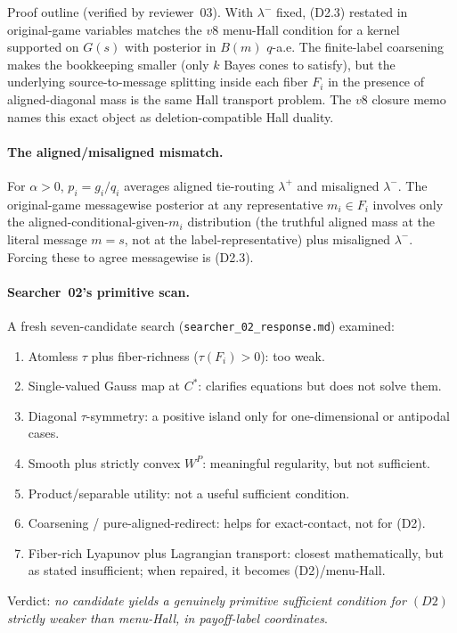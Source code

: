 \documentclass[11pt]{article}
\theoremstyle{definition}
\theoremstyle{remark}
\begin{document}
\noindent Proof outline (verified by reviewer~03). With $\lambda^-$
fixed, (D2.3) restated in original-game variables matches the $v8$
menu-Hall condition for a kernel supported on $G(s)$ with posterior in
$B(m)$ $q$-a.e. The finite-label coarsening makes the bookkeeping
smaller (only $k$ Bayes cones to satisfy), but the underlying
source-to-message splitting inside each fiber $F_i$ in the presence
of aligned-diagonal mass is the same Hall transport problem. The
$v8$ closure memo names this exact object as deletion-compatible Hall
duality.

\paragraph{The aligned/misaligned mismatch.} For $\alpha>0$,
$p_i = g_i/q_i$ averages aligned tie-routing $\lambda^+$ and misaligned
$\lambda^-$. The original-game messagewise posterior at any
representative $m_i\in F_i$ involves only the aligned-conditional-given-$m_i$
distribution (the truthful aligned mass at the literal message $m=s$,
not at the label-representative) plus misaligned $\lambda^-$. Forcing
these to agree messagewise is (D2.3).

\paragraph{Searcher~02's primitive scan.} A fresh seven-candidate
search (\texttt{searcher\_02\_response.md}) examined:
\begin{enumerate}[label=(C\arabic*), leftmargin=*]
  \item Atomless $\tau$ plus fiber-richness ($\tau(F_i)>0$): too weak.
  \item Single-valued Gauss map at $C^*$: clarifies equations but does
    not solve them.
  \item Diagonal $\tau$-symmetry: a positive island only for
    one-dimensional or antipodal cases.
  \item Smooth plus strictly convex $W^P$: meaningful regularity, but
    not sufficient.
  \item Product/separable utility: not a useful sufficient condition.
  \item Coarsening / pure-aligned-redirect: helps for exact-contact, not
    for (D2).
  \item Fiber-rich Lyapunov plus Lagrangian transport: closest
    mathematically, but as stated insufficient; when repaired, it
    becomes (D2)/menu-Hall.
\end{enumerate}
Verdict: \emph{no candidate yields a genuinely primitive sufficient
condition for $(D2)$ strictly weaker than menu-Hall, in payoff-label
coordinates}.
\end{document}
